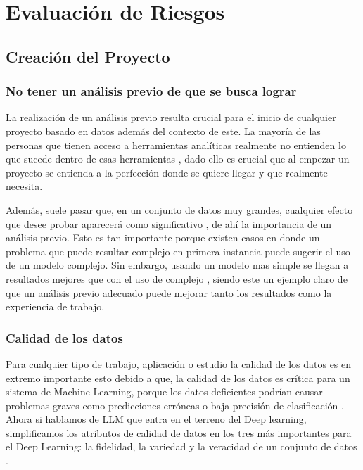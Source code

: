 
\chapter{Evaluación de Riesgos}

\section{Creación del Proyecto}

\subsection{No tener un análisis previo de que se busca lograr}

La realización de un análisis previo resulta crucial para el inicio de cualquier proyecto basado en datos además del contexto de este. 
La mayoría de las personas que tienen acceso a herramientas analíticas realmente no entienden lo que sucede dentro de esas herramientas \cite{datos1}, 
dado ello es crucial que al empezar un proyecto se entienda a la perfección donde se quiere llegar y que realmente necesita. 

Además, suele pasar que, en un conjunto de datos muy grandes, cualquier efecto que desee probar aparecerá como significativo \cite{datos1}, de ahí la 
importancia de un análisis previo. Esto es tan importante porque existen casos en donde un problema que puede resultar complejo en 
primera instancia puede sugerir el uso de un modelo complejo. Sin embargo, usando un modelo mas simple se llegan a resultados mejores 
que con el uso de complejo \cite{datos2}, siendo este un ejemplo claro de que un análisis previo adecuado puede mejorar tanto los resultados como la 
experiencia de trabajo. 

\subsection{Calidad de los datos}

Para cualquier tipo de trabajo, aplicación o estudio la calidad de los datos es en extremo importante esto debido a que, la calidad de los datos 
es crítica para un sistema de Machine Learning, porque los datos deficientes podrían causar problemas graves como predicciones erróneas o baja 
precisión de clasificación \cite{calidad1}. Ahora si hablamos de LLM que entra en el terreno del Deep learning, simplificamos los atributos de calidad de datos 
en los tres más importantes para el Deep Learning: la fidelidad, la variedad y la veracidad de un conjunto de datos \cite{calidad1}.

